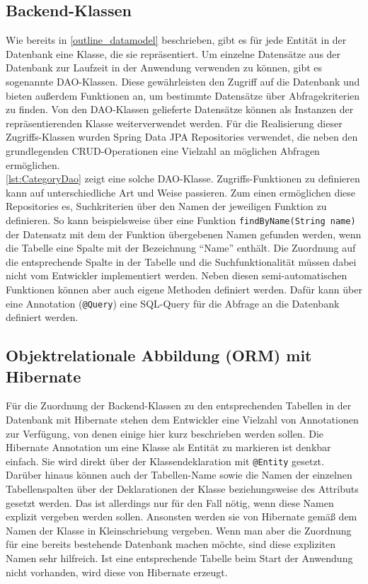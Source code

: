 \subsection{Backend-Klassen}
Wie bereits in \cref{outline_datamodel} beschrieben, gibt es für jede Entität in der Datenbank eine Klasse, die sie repräsentiert.
Um einzelne Datensätze aus der Datenbank zur Laufzeit in der Anwendung verwenden zu können, gibt es sogenannte \acs{DAO}-Klassen.
Diese gewährleisten den Zugriff auf die Datenbank und bieten außerdem Funktionen an, um bestimmte Datensätze über Abfragekriterien zu finden.
Von den \acs{DAO}-Klassen gelieferte Datensätze können als Instanzen der repräsentierenden Klasse weiterverwendet werden.
Für die Realisierung dieser Zugriffs-Klassen wurden Spring Data \acs{JPA} Repositories verwendet, die neben den grundlegenden \acs{CRUD}-Operationen eine Vielzahl an möglichen Abfragen ermöglichen.
\\


\cref{lst:CategoryDao} zeigt eine solche \acs{DAO}-Klasse.
Zugriffs-Funktionen zu definieren kann auf unterschiedliche Art und Weise passieren. Zum einen ermöglichen diese Repositories es, Suchkriterien über den Namen der jeweiligen Funktion zu definieren.
So kann beispielsweise über eine Funktion \texttt{findByName(String name)} der Datensatz mit dem der Funktion übergebenen Namen gefunden werden, wenn die Tabelle eine Spalte mit der Bezeichnung \enquote{Name} enthält.
Die Zuordnung auf die entsprechende Spalte in der Tabelle und die Suchfunktionalität müssen dabei nicht vom Entwickler implementiert werden.
Neben diesen semi-automatischen Funktionen können aber auch eigene Methoden definiert werden. Dafür kann über eine Annotation (\texttt{@Query}) eine \acs{SQL}-Query für die Abfrage an die Datenbank definiert werden.

\subsection{Objektrelationale Abbildung (\acs{ORM}) mit Hibernate}
Für die Zuordnung der Backend-Klassen zu den entsprechenden Tabellen in der Datenbank mit Hibernate stehen dem Entwickler eine Vielzahl von Annotationen zur Verfügung, von denen einige hier kurz beschrieben werden sollen.
Die Hibernate Annotation um eine Klasse als Entität zu markieren ist denkbar einfach. Sie wird direkt über der Klassendeklaration mit \texttt{@Entity} gesetzt.
Darüber hinaus können auch der Tabellen-Name sowie die Namen der einzelnen Tabellenspalten über der Deklarationen der Klasse beziehungsweise des Attributs gesetzt werden.
Das ist allerdings nur für den Fall nötig, wenn diese Namen explizit vergeben werden sollen. Ansonsten werden sie von Hibernate gemäß dem Namen der Klasse in Kleinschriebung vergeben.
Wenn man aber die Zuordnung für eine bereits bestehende Datenbank machen möchte, sind diese expliziten Namen sehr hilfreich.
Ist eine entsprechende Tabelle beim Start der Anwendung nicht vorhanden, wird diese von Hibernate erzeugt.

